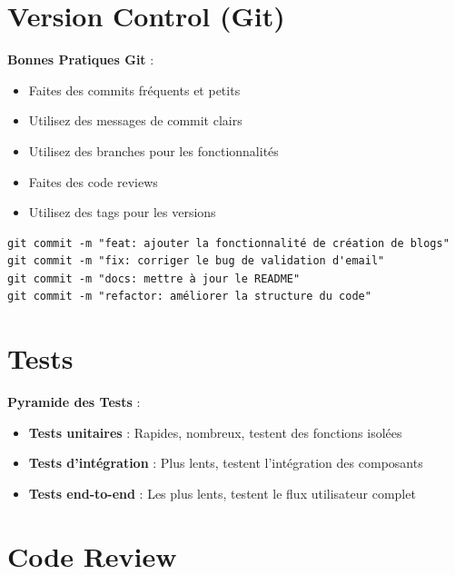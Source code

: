 \section{Version Control (Git)}

\begin{bestpracticebox}
    \textbf{Bonnes Pratiques Git} :
    \begin{itemize}
        \item Faites des commits fréquents et petits
        \item Utilisez des messages de commit clairs
        \item Utilisez des branches pour les fonctionnalités
        \item Faites des code reviews
        \item Utilisez des tags pour les versions
    \end{itemize}
\end{bestpracticebox}

\begin{lstlisting}[style=bash, caption=Conventions de commit]
git commit -m "feat: ajouter la fonctionnalité de création de blogs"
git commit -m "fix: corriger le bug de validation d'email"
git commit -m "docs: mettre à jour le README"
git commit -m "refactor: améliorer la structure du code"
\end{lstlisting}

\section{Tests}

\begin{definitionbox}
    \textbf{Pyramide des Tests} :
    \begin{itemize}
        \item \textbf{Tests unitaires} : Rapides, nombreux, testent des fonctions isolées
        \item \textbf{Tests d'intégration} : Plus lents, testent l'intégration des composants
        \item \textbf{Tests end-to-end} : Les plus lents, testent le flux utilisateur complet
    \end{itemize}
\end{definitionbox}

\section{Code Review}

